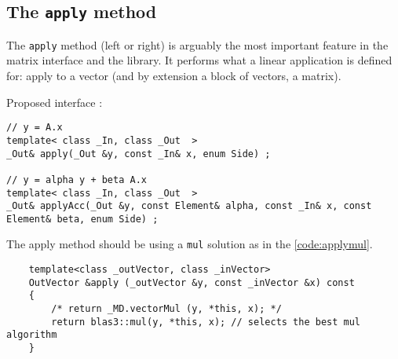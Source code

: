 \subsection{The \texttt{apply} method}
%
The \texttt{apply} method (left or right) is arguably the most important feature in the
matrix interface and the \linbox library. It performs what a linear application is defined for:
apply to a vector (and by extension  a block of vectors, \ie a matrix).
%
\par
%
Proposed interface :
%
{
\begin{lstlisting}
// y = A.x
template< class _In, class _Out  >
_Out& apply(_Out &y, const _In& x, enum Side) ;

// y = alpha y + beta A.x
template< class _In, class _Out  >
_Out& applyAcc(_Out &y, const Element& alpha, const _In& x, const Element& beta, enum Side) ;

\end{lstlisting}
}
%
The apply method should be using a \texttt{mul} solution as in the \cref{code:applymul}.
{
	\begin{lstlisting}
	template<class _outVector, class _inVector>
	OutVector &apply (_outVector &y, const _inVector &x) const
	{
		/* return _MD.vectorMul (y, *this, x); */
		return blas3::mul(y, *this, x); // selects the best mul algorithm
	}
	\end{lstlisting}
}

